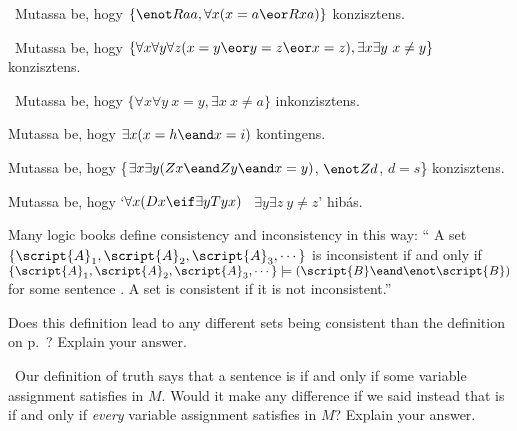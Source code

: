 \begin{earg}
\item\leftsolutions\ Mutassa be, hogy $\{{\enot}Raa, \forall x (x=a \eor Rxa)\}$
konzisztens.
\item\leftsolutions\ Mutassa be, hogy $\{\forall x\forall y\forall z(x=y \eor y=z \eor x=z),
\exists x\exists y\ x\neq y\}$ konzisztens.
\item\leftsolutions\ Mutassa be, hogy $\{\forall x\forall y\ x=y, \exists x\ x \neq a\}$ inkonzisztens.
\item Mutassa be, hogy $\exists x (x = h \eand x = i)$ kontingens.
\item Mutassa be, hogy \{$\exists x\exists y(Zx \eand Zy \eand x=y)$, $\enot Zd$, $d=s$\} konzisztens.
\item Mutassa be, hogy `$\forall x(Dx \eif \exists y Tyx)$ \therefore\ $\exists y \exists z\ y\neq z$' hibás.
\end{earg}




\problempart
\label{pr.SemanticsEssay}
\begin{earg}
\item Many logic books define consistency and inconsistency in this way:
`` A set $\{\script{A}_1,\script{A}_2,\script{A}_3,\cdots\}$ is inconsistent if and only if $\{\script{A}_1,\script{A}_2,\script{A}_3,\cdots\}\models(\script{B}\eand\enot\script{B})$ for some sentence . A set is consistent if it is not inconsistent.''

Does this definition lead to any different sets being consistent than the definition on  p.~\pageref{def.consistencySL}? Explain your answer.

\item\leftsolutions\ Our definition of truth says that a sentence  is   if and only if some variable assignment satisfies  in $M$. Would it make any difference if we said instead that  is   if and only if \emph{every} variable assignment satisfies  in $M$? Explain your answer.
\end{earg}

